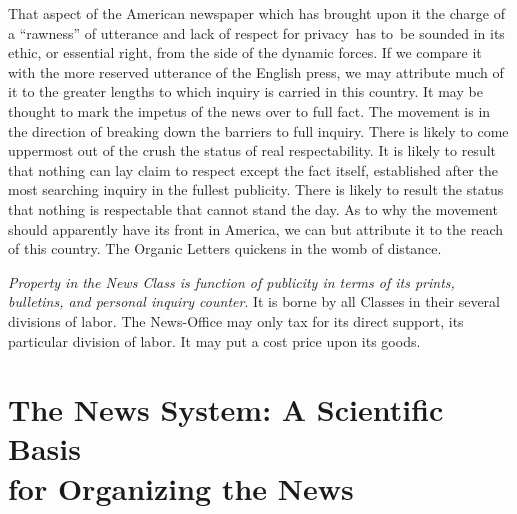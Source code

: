 \documentclass[twoside,symmetric,nobib,justified]{tufte-book}
\let\oldchapter\chapter
\def\chapter{%
  \setcounter{footnote}{0}%
  \oldchapter
}
\begin{document}
That aspect of the American newspaper which has brought upon it the
charge of a ``rawness'' of utterance and lack of respect for privacy~has
to~be sounded in its ethic, or essential right, from the side of the
dynamic forces. If we compare it with the more reserved utterance of the
English press, we may attribute much of it to the greater lengths to
which inquiry is carried in this country. It may be thought to mark the
impetus of the news over to full fact. The movement is in the direction
of breaking down the barriers to full inquiry. There is likely to come
uppermost out of the crush the status of real respectability. It is
likely to result that nothing can lay claim to respect except the fact
itself, established after the most searching inquiry in the fullest
publicity. There is likely to result the status that nothing is
respectable that cannot stand the day. As to why the movement should
apparently have its front in America, we can but attribute it to the
reach of this country. The Organic Letters quickens in the womb of
distance.~

\vspace{0.05in}

\emph{Property in the News Class is function of publicity in terms of
its prints, bulletins, and personal inquiry counter}. It is borne by all
Classes in their several divisions of labor. The News-Office may only
tax for its direct support, its particular division of labor. It may put
a cost price upon its goods.~~


\chapter[The News System: A Scientific Basis for Organizing the News]{The News System: A Scientific Basis\\\noindent for Organizing the News}
\label{ch:The News System: A Scientific Basis for Organizing the News}

\vspace{.2in}

\begin{LARGE}


\end{LARGE}

\vspace{0.5in}
\end{document}
